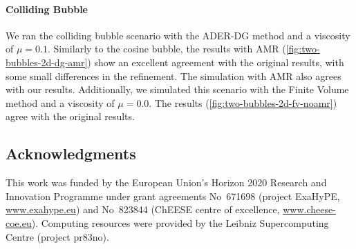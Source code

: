 \documentclass[runningheads]{llncs}
\begin{document}
\paragraph{Colliding Bubble}
We ran the colliding bubble scenario with the ADER-DG method and a viscosity of $\mu=0.1$.
Similarly to the cosine bubble, the results with AMR (\cref{fig:two-bubbles-2d-dg-amr}) show an excellent agreement with the original results, with some small differences in the refinement.
The simulation with AMR also agrees with our results.
Additionally, we simulated this scenario with the Finite Volume method and a viscosity of $\mu=0.0$.
The results (\cref{fig:two-bubbles-2d-fv-noamr}) agree with the original results.

\subsection*{Acknowledgments}
This work was funded by the European Union’s Horizon 2020 Research and Innovation Programme under grant agreements 
No~671698 (project ExaHyPE, \url{www.exahype.eu}) and 
No~823844 (ChEESE centre of excellence, \url{www.cheese-coe.eu}).
Computing resources were provided by the Leibniz Supercomputing Centre (project pr83no).


{}
\end{document}
